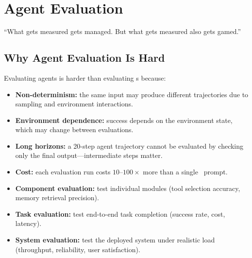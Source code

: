 \chapter{Agent Evaluation}
\label{ch:evaluation}

\epigraph{``What gets measured gets managed. But what gets measured also gets gamed.''}{}


\section{Why Agent Evaluation Is Hard}

Evaluating agents is harder than evaluating \llm s because:
\begin{itemize}
	\item \textbf{Non-determinism:} the same input may produce different trajectories due to sampling and environment interactions.
	\item \textbf{Environment dependence:} success depends on the environment state, which may change between evaluations.
	\item \textbf{Long horizons:} a 20-step agent trajectory cannot be evaluated by checking only the final output---intermediate steps matter.
	\item \textbf{Cost:} each evaluation run costs $10$--$100\times$ more than a single \llm\ prompt.
\end{itemize}

\begin{definition}
	\begin{itemize}
		\item \textbf{Component evaluation:} test individual modules (tool selection accuracy, memory retrieval precision).
		\item \textbf{Task evaluation:} test end-to-end task completion (success rate, cost, latency).
		\item \textbf{System evaluation:} test the deployed system under realistic load (throughput, reliability, user satisfaction).
	\end{itemize}
\end{definition}

